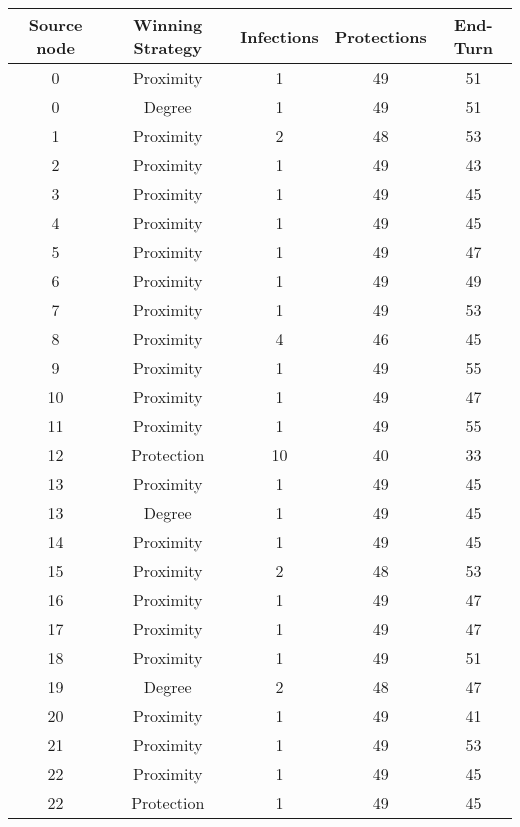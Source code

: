 \documentclass[results.tex]{subfiles}
\begin{document}
\begin{center}
  \begin{tabular}{| c || c | c | c | c |}
    \hline
    {\bfseries Source node} & {\bfseries Winning Strategy} & {\bfseries Infections} & {\bfseries Protections} & {\bfseries End-Turn} \\  %
    \hline\hline
    0 & Proximity & 1 & 49 & 51 \\ 
    \hline
    0 & Degree & 1 & 49 & 51 \\ 
    \hline
    1 & Proximity & 2 & 48 & 53 \\ 
    \hline
    2 & Proximity & 1 & 49 & 43 \\ 
    \hline
    3 & Proximity & 1 & 49 & 45 \\ 
    \hline
    4 & Proximity & 1 & 49 & 45 \\ 
    \hline
    5 & Proximity & 1 & 49 & 47 \\ 
    \hline
    6 & Proximity & 1 & 49 & 49 \\ 
    \hline
    7 & Proximity & 1 & 49 & 53 \\ 
    \hline
    8 & Proximity & 4 & 46 & 45 \\ 
    \hline
    9 & Proximity & 1 & 49 & 55 \\ 
    \hline
    10 & Proximity & 1 & 49 & 47 \\ 
    \hline
    11 & Proximity & 1 & 49 & 55 \\ 
    \hline
    12 & Protection & 10 & 40 & 33 \\ 
    \hline
    13 & Proximity & 1 & 49 & 45 \\ 
    \hline
    13 & Degree & 1 & 49 & 45 \\ 
    \hline
    14 & Proximity & 1 & 49 & 45 \\ 
    \hline
    15 & Proximity & 2 & 48 & 53 \\ 
    \hline
    16 & Proximity & 1 & 49 & 47 \\ 
    \hline
    17 & Proximity & 1 & 49 & 47 \\ 
    \hline
    18 & Proximity & 1 & 49 & 51 \\ 
    \hline
    19 & Degree & 2 & 48 & 47 \\ 
    \hline
    20 & Proximity & 1 & 49 & 41 \\ 
    \hline
    21 & Proximity & 1 & 49 & 53 \\ 
    \hline
    22 & Proximity & 1 & 49 & 45 \\ 
    \hline
    22 & Protection & 1 & 49 & 45 \\ 

\end{tabular}
\end{center}
\end{document}
